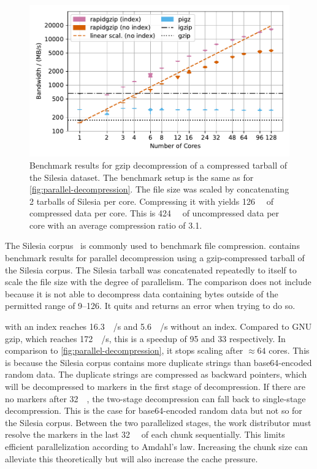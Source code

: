 \begin{figure}
    \centering
    \includegraphics[width=\linewidth]{plots/result-parallel-decompression-silesia-dev-null-bandwidths-number-of-threads.pdf}
    \caption{
        Benchmark results for gzip decompression of a compressed tarball of the Silesia dataset.
        The benchmark setup is the same as for \cref{fig:parallel-decompression}.
        The file size was scaled by concatenating 2 tarballs of Silesia per core.
        Compressing it with \pigz yields \SI{126}{\mega\byte} of compressed data per core.
        This is \SI{424}{\mega\byte} of uncompressed data per core with an average compression ratio of \num{3.1}.
    }
    \label{fig:parallel-decompression-silesia}
\end{figure}

The Silesia corpus~\cite{silesia} is commonly used to benchmark file compression.
 contains benchmark results for parallel decompression using a gzip-compressed tarball of the Silesia corpus.
The Silesia tarball was concatenated repeatedly to itself to scale the file size with the degree of parallelism.
The comparison does not include \pugz because it is not able to decompress data containing bytes outside of the permitted range of 9--126.
It quits and returns an error when trying to do so.

\pragzip with an index reaches \SI{16.3}{\giga\byte/\second} and \SI{5.6}{\giga\byte/\second} without an index.
Compared to GNU gzip, which reaches \SI{172}{\giga\byte/\second}, this is a speedup of \num{95} and \num{33} respectively.
In comparison to \cref{fig:parallel-decompression}, it stops scaling after $\approx 64$ cores.
This is because the Silesia corpus contains more duplicate strings than base64-encoded random data.
The duplicate strings are compressed as backward pointers, which will be decompressed to markers in the first stage of decompression.
If there are no markers after \SI{32}{\kibi\byte}, the two-stage decompression can fall back to single-stage decompression.
This is the case for base64-encoded random data but not so for the Silesia corpus.
Between the two parallelized stages, the work distributor must resolve the markers in the last \SI{32}{\kibi\byte} of each chunk sequentially.
This limits efficient parallelization according to Amdahl's law.
Increasing the chunk size can alleviate this theoretically but will also increase the cache pressure.

